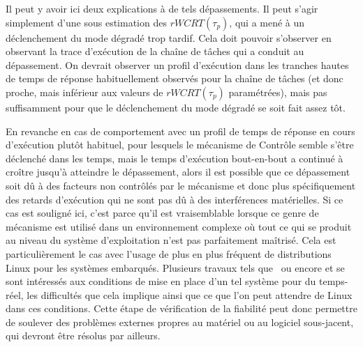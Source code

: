 \documentclass[french, a4paper, 11pt, twoside, pdftex]{StyleThese}
\begin{document}
        Il peut y avoir ici deux explications à de tels dépassements. Il peut s'agir simplement d'une sous estimation des $rWCRT(\tau_p) $, qui a mené à un déclenchement du mode dégradé trop tardif.
        Cela doit pouvoir s'observer en observant la trace d'exécution de la chaîne de tâches qui a conduit au dépassement. On devrait observer un profil d'exécution dans les tranches hautes de temps de réponse habituellement observés pour la chaîne de tâches (et donc proche, mais inférieur aux valeurs de $rWCRT(\tau_p)$ paramétrées), mais pas suffisamment pour que le déclenchement du mode dégradé se soit fait assez tôt.
        
        En revanche en cas de comportement avec un profil de temps de réponse en cours d'exécution plutôt habituel, pour lesquels le mécanisme de Contrôle semble s'être déclenché dans les temps, mais le temps d'exécution bout-en-bout a continué à croître jusqu'à atteindre le dépassement, alors il est possible que ce dépassement soit dû à des facteurs non contrôlés par le mécanisme et donc plus spécifiquement des retards d'exécution qui ne sont pas dû à des interférences matérielles. 
        Si ce cas est souligné ici, c'est parce qu'il est vraisemblable lorsque ce genre de mécanisme est utilisé dans un environnement complexe où tout ce qui se produit au niveau du système d'exploitation n'est pas parfaitement maîtrisé. Cela est particulièrement le cas avec l'usage de plus en plus fréquent de distributions Linux pour les systèmes embarqués. Plusieurs travaux tels que~\cite{allende_towards_2019} ou encore \cite{sivakumar_automotive_2020} et \cite{serra_architecture_2020} se sont intéressés aux conditions de mise en place d'un tel système pour du temps-réel, les difficultés que cela implique ainsi que ce que l'on peut attendre de Linux dans ces conditions. Cette étape de vérification de la fiabilité peut donc permettre de soulever des problèmes externes propres au matériel ou au logiciel sous-jacent, qui devront être résolus par ailleurs.
                    
\end{document}
